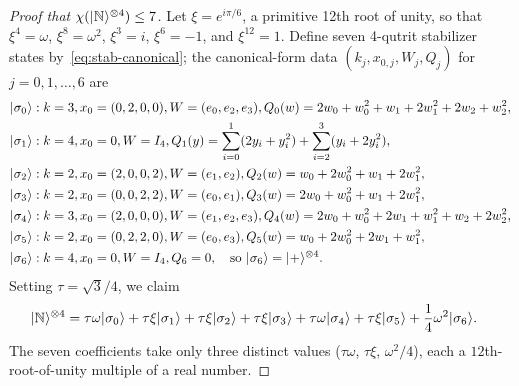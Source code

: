 \documentclass[11pt]{article}
\theoremstyle{definition}
\newcommand{\microspace}{\mspace{0.5mu}}
\newcommand{\ket}[1]{\lvert\microspace #1 \microspace \rangle}
\newcommand{\chiR}{\chi}
\newcommand{\Norrell}{\ket{\mathbb{N}}}
\begin{document}
	\begin{proof}[Proof that $\chiR(\Norrell^{\otimes 4}) \le 7$]
		Let $\xi = e^{i \pi / 6}$, a primitive 12th root of unity, so that
		$\xi^4 = \omega$, $\xi^8 = \omega^2$, $\xi^3 = i$, $\xi^6 = -1$, and
		$\xi^{12} = 1$. Define seven 4-qutrit stabilizer
		states by~\eqref{eq:stab-canonical}; the canonical-form data
		$(k_j, x_{0,j}, W_j, Q_j)$ for $j = 0, 1, \ldots, 6$ are
		\begin{equation}\label{eq:norrell-m4-states}
			\begin{aligned}
				\ket{\sigma_0} &: k = 3, x_0 = (0, 2, 0, 0), W = (e_0, e_2, e_3), 
				Q_0(w) = 2 w_0 + w_0^2 + w_1 + 2 w_1^2 + 2 w_2 + w_2^2, \\
				\ket{\sigma_1} &: k = 4, x_0 = 0, W = I_4,
				Q_1(y) = \sum_{i=0}^{1} (2 y_i + y_i^2)
				+ \sum_{i=2}^{3} (y_i + 2 y_i^2), \\
				\ket{\sigma_2} &: k = 2, x_0 = (2, 0, 0, 2), W = (e_1, e_2), 
				Q_2(w) = w_0 + 2 w_0^2 + w_1 + 2 w_1^2, \\
				\ket{\sigma_3} &: k = 2, x_0 = (0, 0, 2, 2), W = (e_0, e_1), 
				Q_3(w) = 2 w_0 + w_0^2 + w_1 + 2 w_1^2, \\
				\ket{\sigma_4} &: k = 3, x_0 = (2, 0, 0, 0), W = (e_1, e_2, e_3), 
				Q_4(w) = 2 w_0 + w_0^2 + 2 w_1 + w_1^2 + w_2 + 2 w_2^2, \\
				\ket{\sigma_5} &: k = 2, x_0 = (0, 2, 2, 0), W = (e_0, e_3), 
				Q_5(w) = w_0 + 2 w_0^2 + 2 w_1 + w_1^2, \\
				\ket{\sigma_6} &: k = 4, x_0 = 0, W = I_4, Q_6 = 0,
				\quad \text{so } \ket{\sigma_6} = \ket{+}^{\otimes 4}.
			\end{aligned}
		\end{equation}
		Setting $\tau = \sqrt 3 / 4$, we claim
		\begin{equation}\label{eq:norrell-m4-id}
			\begin{aligned}
				\Norrell^{\otimes 4}
				&= \tau\omega  \ket{\sigma_0} + \tau\xi  \ket{\sigma_1}
				+ \tau\xi  \ket{\sigma_2} + \tau\xi  \ket{\sigma_3}
				+ \tau\omega  \ket{\sigma_4} + \tau\xi  \ket{\sigma_5}
				+ \frac{1}{4}\omega^2  \ket{\sigma_6}.
			\end{aligned}
		\end{equation}
		The seven coefficients take only three distinct values
		($\tau\omega$, $\tau\xi$, $\omega^2/4$), each a $12$th-root-of-unity
		multiple of a real number.
		

\end{proof}
\end{document}
